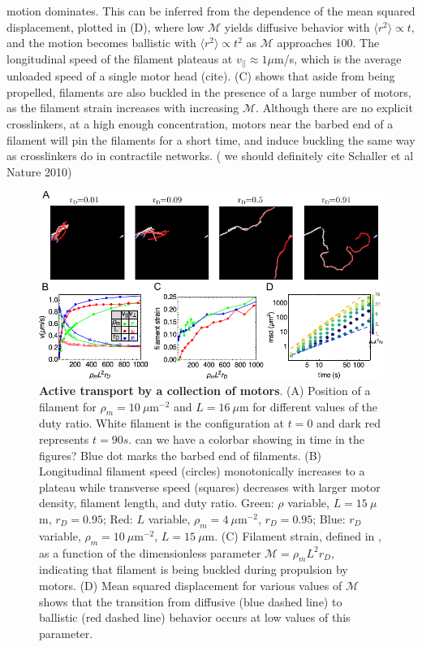 \documentclass[11pt]{article}
\begin{document}
motion dominates. This can be {\color{red}inferred} from the {\color{red}dependence of the} mean squared displacement, plotted in (D), where low $\mathcal{M}$ 
yields diffusive behavior with $\langle r^2 \rangle \propto t$, and the motion becomes ballistic with $\langle r^2\rangle\propto t^2$ 
as $\mathcal{M}$ {\color{red}approaches 100}.
The {\color{red}longitudinal} speed of {\color{red}the filament} plateaus at $v_{||}\approx 1\mu$m/s, which is the average unloaded {\color{red}speed of a single motor head} {\color{blue}(cite)}. (C) shows that aside from being propelled, filaments are also
buckled in the presence of a large number of motors, as the filament strain increases with increasing $\mathcal{M}$. 
Although there are no explicit crosslinkers, at a high enough concentration, motors near the barbed end 
of a filament will pin the filaments for a short time, and induce buckling the same way as crosslinkers 
do in contractile networks. {\color{blue}( we should definitely cite Schaller et al Nature 2010)}
\begin{figure}[H] 
    \centering
    \includegraphics[width=\columnwidth]{figs/motility/mot_fig.pdf}
  \caption{%
  \label{fig:motility}%
  {\bf Active transport by a collection of motors}. (A) Position of a filament for $\rho_m = 10\ \mu$m$^{-2}$ and $L = 16\ \mu$m for
  different values of the duty ratio. White filament is {\color{red}the configuration at} $t=0$ and dark red {\color{red}represents} $t=90s$. {\color{blue}can we have a colorbar showing in time in the figures?} Blue dot marks the barbed end of filaments.  
  (B) Longitudinal filament speed (circles) monotonically increases to a plateau while transverse speed 
  (squares) decreases with larger motor density, filament length, and duty ratio. Green: $\rho$ variable, $L=15\ \mu$m,
  $r_D=0.95$; Red: $L$ variable, $\rho_m=4\ \mu$m$^{-2}$, $r_D=0.95$; Blue: $r_D$ variable, $\rho_m = 10\ \mu$m$^{-2}$, $L=15\ \mu$m.  
  (C) Filament strain, defined in , as a function of the dimensionless
  parameter $\mathcal{M}=\rho_m L^2 r_D$, indicating that {\color{red}filament} is being buckled {\color{red}during propulsion} by motors. 
  (D) Mean squared displacement for various values of $\mathcal{M}$ shows that the transition from
  diffusive (blue dashed line) to ballistic (red dashed line) behavior occurs at low values of this parameter.     
 }
\end{figure}
\end{document}
